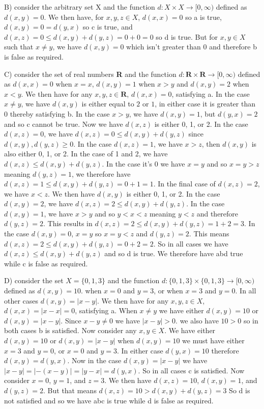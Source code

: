 \documentclass[12pt]{article}
\begin{document}
B) consider the arbitrary set X and the function $d:X\times X\to [0,\infty)$ defined as $d(x,y)=0$. We then have, for $x,y,z\in X$, $d(x,x) = 0$ so a is true, $d(x,y) = 0 = d(y,x)$ so c is true, and $d(x,z) = 0\leq d(x,y)+d(y,z)=0+0=0$ so d is true. But for $x,y\in X$ such that $x\neq y$, we have $d(x,y)= 0$ which isn't greater than 0 and therefore b is false as required. 

C) consider the set of real numbers \textbf{R} and the function $d:\textbf{R}\times \textbf{R}\to [0,\infty)$ defined as $d(x,x) = 0$ when $x=x$, $d(x,y) = 1$ when $x>y$ and $d(x,y) = 2$ when $x<y$. We then have for any $x,y,z\in \textbf{R}$, $d(x,x) = 0$, satisfying a. In the case $x\neq y$, we have $d(x,y)$ is either equal to $2$ or $1$, in either case it is greater than 0 thereby satisfying b. In the case $x>y$, we have $d(x,y)=1$, but $d(y,x) = 2$ and so c cannot be true. Now we have $d(x,z)$ is either 0, 1, or 2. In the case $d(x,z) = 0$, we have $d(x,z)= 0\leq d(x,y) +d(y,z)$ since $d(x,y),d(y,z)\geq 0$. In the case $d(x,z) = 1$, we have $x>z$, then $d(x,y)$ is also either 0, 1, or 2. In the case of 1 and 2, we have $d(x,z)\leq d(x,y)+d(y,z)$. In the case it's 0 we have $x=y$ and so $x=y>z$ meaning $d(y,z) = 1$, we therefore have $d(x,z)=1 \leq d(x,y) +d(y,z) = 0 + 1 = 1$. In the final case of $d(x,z) = 2$, we have $x<z$. We then have $d(x,y)$ is either 0, 1, or 2. In the case $d(x,y) =2$, we have $d(x,z)=2 \leq d(x,y)+d(y,z)$. In the case $d(x,y) = 1$, we have $x>y$ and so $y<x<z$ meaning $y<z$ and therefore $d(y,z) =2$. This results in $d(x,z)=2 \leq d(x,y) +d(y,z) = 1+2=3$. In the case $d(x,y) = 0$, $x=y$ so $x=y<z$ and $d(y,z) =2$. This means $d(x,z)=2 \leq d(x,y) +d(y,z) = 0+2 = 2$. So in all cases we have $d(x,z) \leq d(x,y)+d(y,z)$ and so d is true. We therefore have abd true while c is false as required.

D) consider the set $X=\{0,1,3\}$ and the function $d:\{0,1,3\}\times\{0,1,3\}\to [0,\infty)$ defined as $d(x,y) = 10.$ when $x=0$ and $y =3$, or when $x=3$ and $y=0$. In all other cases $d(x,y) = |x-y|$. We then have for any $x,y,z\in X$, $d(x,x) = |x-x|=0$, satisfying a. When $x\neq y$ we have either $d(x,y) = 10$ or $d(x,y) = |x-y|$. Since $x-y\neq 0$ we have $|x-y| >0$. we also have $10>0$ so in both cases b is satisfied. Now consider any $x,y\in X$. We have either $d(x,y) =10$ or $d(x,y) = |x-y|$ when $d(x,y) = 10$ we must have either $x=3$ and $y=0$, or $x=0$ and $y=3$. In either case $d(y,x)=10$ therefore $d(x,y) =d(y,x).$ Now in the case $d(x,y) =|x-y|$ we have $|x-y|=|-(x-y)|=|y-x| = d(y,x)$. So in all cases c is satisfied. Now consider $x=0$, $y=1$, and $z=3$. We then have $d(x,z) = 10 $, $d(x,y) = 1$, and $d(y,z) = 2$. But that means $d(x,z)=10>d(x,y) +d(y,z) = 3$ So d is not satisfied and so we have abc is true while d is false as required.
\end{document}
